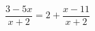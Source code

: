 \begin{ex}[type=equation]
	\begin{condition}
		\( \dfrac{3-5x}{x+2}=2+\dfrac{x-11}{x+2} \)
	\end{condition}
\end{ex}